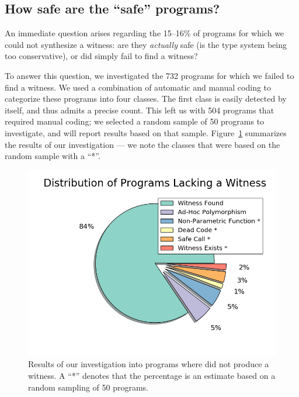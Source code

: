 \subsection{How safe are the ``safe'' programs?}
\label{sec:nanomaly:how-safe}

An immediate question arises regarding the 15--16\% of programs for
which we could not synthesize a witness:
%
are they \emph{actually} safe (\ie is the type system being too conservative),
%
or did \toolname simply fail to find a witness?
%

To answer this question, we investigated the 732 \ucsdbench programs for
which we failed to find a witness.
%
We used a combination of automatic and manual coding to categorize these
programs into four classes.
%
The first class is easily detected by \toolname itself, and thus admits
a precise count.
%
This left us with 504 programs that required manual coding; we selected
a random sample of 50 programs to investigate, and will report results
based on that sample.
%
Figure~\ref{fig:no-witness} summarizes the results of our investigation ---
we note the classes that were based on the random sample with a ``*''.


\begin{figure}[t]
\includegraphics[width=0.7\linewidth]{nanomaly/distrib_ext.png}
\vspace{-0.75cm}
\caption{Results of our investigation into programs where \toolname
  did not produce a witness. A ``*'' denotes that the percentage is an
  estimate based on a random sampling of 50 programs.}
\label{fig:no-witness}
\end{figure}

